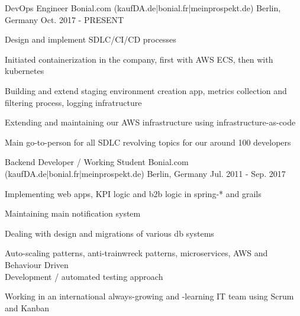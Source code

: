 


\begin{cventries}



\cventry
{DevOps Engineer} %
{Bonial.com (kaufDA.de|bonial.fr|meinprospekt.de)} %
{Berlin, Germany} %
{Oct. 2017 - PRESENT} %
{ %
\begin{cvitems}
\item {Design and implement SDLC/CI/CD processes}
\item {Initiated containerization in the company, first with AWS ECS, then with kubernetes}
\item {Building and extend staging environment creation app, metrics collection and filtering process, logging infratructure}
\item {Extending and maintaining our AWS infrastructure using infrastructure-as-code }
\item {Main go-to-person for all SDLC revolving topics for our around 100 developers}
\end{cvitems}
}


\cventry
{Backend Developer / Working Student} %
{Bonial.com (kaufDA.de|bonial.fr|meinprospekt.de)} %
{Berlin, Germany} %
{Jul. 2011 - Sep. 2017} %
{ %
\begin{cvitems}
\item {Implementing web apps, KPI logic and b2b logic in spring-* and grails}
\item {Maintaining main notification system}
\item {Dealing with design and migrations of various db systems}
\item {Auto-scaling patterns, anti-trainwreck patterns, microservices, AWS and Behaviour Driven \\ Development / automated testing approach}
\item {Working in an international always-growing and -learning IT team using Scrum and Kanban}
\end{cvitems}
}


\end{cventries}
